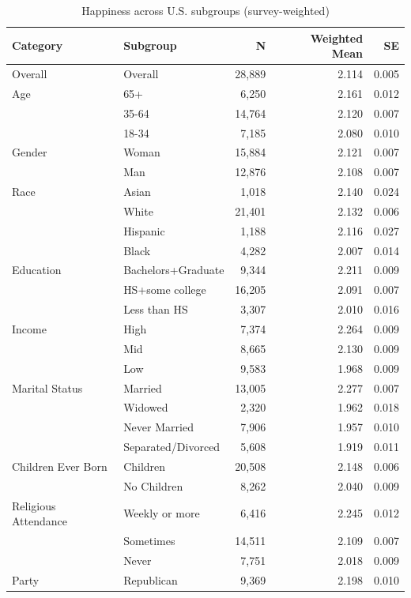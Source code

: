 \begin{table}[htbp]
\centering
\caption{Happiness across U.S. subgroups (survey-weighted)}
\begin{tabular}{llrrr}
\toprule
Category & Subgroup & N & Weighted Mean & SE \\
\midrule
Overall & Overall & 28,889 & 2.114 & 0.005 \\
\midrule
Age & 65+ & 6,250 & 2.161 & 0.012 \\
 & 35-64 & 14,764 & 2.120 & 0.007 \\
 & 18-34 & 7,185 & 2.080 & 0.010 \\
\midrule
Gender & Woman & 15,884 & 2.121 & 0.007 \\
 & Man & 12,876 & 2.108 & 0.007 \\
\midrule
Race & Asian & 1,018 & 2.140 & 0.024 \\
 & White & 21,401 & 2.132 & 0.006 \\
 & Hispanic & 1,188 & 2.116 & 0.027 \\
 & Black & 4,282 & 2.007 & 0.014 \\
\midrule
Education & Bachelors+Graduate & 9,344 & 2.211 & 0.009 \\
 & HS+some college & 16,205 & 2.091 & 0.007 \\
 & Less than HS & 3,307 & 2.010 & 0.016 \\
\midrule
Income & High & 7,374 & 2.264 & 0.009 \\
 & Mid & 8,665 & 2.130 & 0.009 \\
 & Low & 9,583 & 1.968 & 0.009 \\
\midrule
Marital Status & Married & 13,005 & 2.277 & 0.007 \\
 & Widowed & 2,320 & 1.962 & 0.018 \\
 & Never Married & 7,906 & 1.957 & 0.010 \\
 & Separated/Divorced & 5,608 & 1.919 & 0.011 \\
\midrule
Children Ever Born & Children & 20,508 & 2.148 & 0.006 \\
 & No Children & 8,262 & 2.040 & 0.009 \\
\midrule
Religious Attendance & Weekly or more & 6,416 & 2.245 & 0.012 \\
 & Sometimes & 14,511 & 2.109 & 0.007 \\
 & Never & 7,751 & 2.018 & 0.009 \\
\midrule
Party & Republican & 9,369 & 2.198 & 0.010 \\

\end{tabular}
\end{table}
